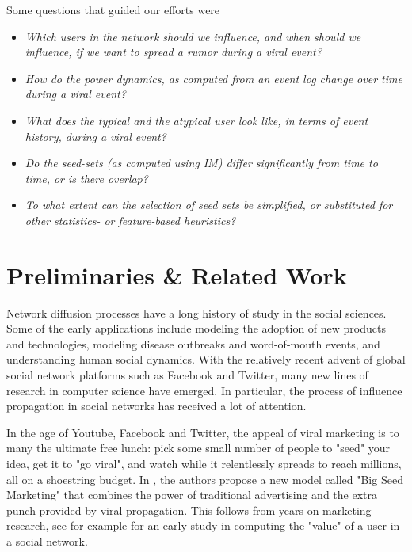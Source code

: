 \documentclass[sigconf]{acmart}
\begin{document}
Some questions that guided our efforts were
\begin{itemize}
\item \emph{Which users in the network should we influence, and when should we influence, if we want to spread a rumor during a viral event?}

\item \emph{How do the power dynamics, as computed from an event log change over time during a viral event?}

\item \emph{What does the typical and the atypical user look like, in terms of event history, during a viral event?}

\item \emph{Do the seed-sets (as computed using IM) differ significantly from time to time, or is there overlap?}

\item \emph{To what extent can the selection of seed sets be simplified, or substituted for other statistics- or feature-based heuristics? }

\end{itemize}

\section{Preliminaries \& Related Work}

Network diffusion processes have a long history of study in the social sciences. Some of the early applications include modeling the adoption of new products and technologies, modeling disease outbreaks and word-of-mouth events, and understanding human social dynamics. With the relatively recent advent of global social network platforms such as Facebook and Twitter, many new lines of research in computer science have emerged. In particular, the process of influence propagation in social networks has received a lot of attention.

In the age of Youtube, Facebook and Twitter, the appeal of viral marketing is to many the ultimate free lunch: pick some small number of people to "seed" your idea, get it to "go viral", and watch while it relentlessly spreads to reach millions, all on a shoestring budget. In \cite{watts2007viral}, the authors propose a new model called "Big Seed Marketing" that combines the power of traditional advertising and the extra punch provided by viral propagation. This follows from years on marketing research, see for example \cite{domingos2001mining} for an early study in computing the "value" of a user in a social network. 
\end{document}
